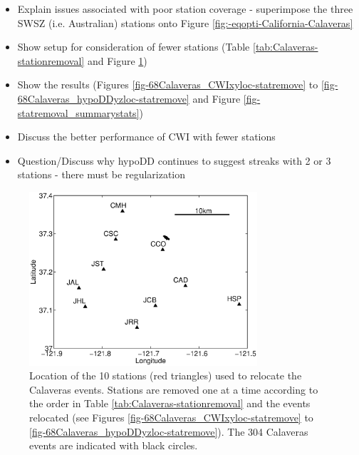 \documentclass[extra]{gji}
\begin{document}
\begin{itemize}
\item Explain issues associated with poor station coverage - superimpose
the three SWSZ (i.e. Australian) stations onto  Figure
\ref{fig:-eqopti-California-Calaveras}
\item Show setup for consideration of fewer stations (Table
\ref{tab:Calaveras-stationremoval}
and Figure \ref{fig:-eqopti-Calaveras-substations})
\item Show the results (Figures \ref{fig-68Calaveras_CWIxyloc-statremove}
to \ref{fig-68Calaveras_hypoDDyzloc-statremove} and Figure \ref{fig-statremoval_summarystats})
\item Discuss the better performance of CWI with fewer stations
\item Question/Discuss why hypoDD continues to suggest streaks with 2 or 3 stations - there must be regularization
\end{itemize}

\begin{figure}
\noindent\includegraphics[width = 20pc]{diags/CalaverasMap/matlab/Calaveras_substationmap}
\caption{Location of the 10 stations (red triangles) used to relocate the Calaveras events.
Stations are removed one at a time according to the order in Table \ref{tab:Calaveras-stationremoval} and the events
relocated (see Figures \ref{fig-68Calaveras_CWIxyloc-statremove} to \ref{fig-68Calaveras_hypoDDyzloc-statremove}).
The 304 Calaveras events are indicated with black circles.}
\label{fig:-eqopti-Calaveras-substations}
\end{figure}
\end{document}
